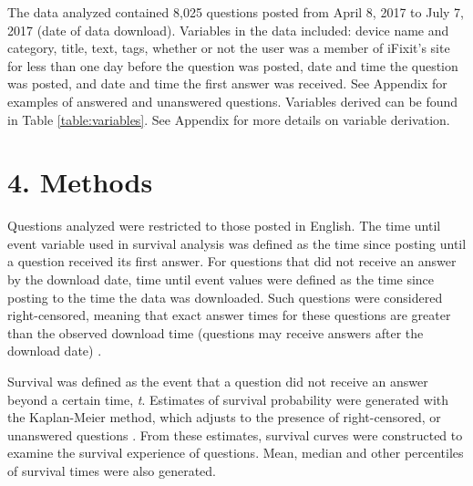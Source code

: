 \documentclass{article}
\begin{document}
The data analyzed contained 8,025 questions posted from April 8, 2017 to July 7, 2017 (date of data download). Variables in the data included: device name and category, title, text, tags, whether or not the user was a member of iFixit's site for less than one day before the question was posted, date and time the question was posted, and date and time the first answer was received. See Appendix for examples of answered and unanswered questions. Variables derived can be found in Table \ref{table:variables}. See Appendix for more details on variable derivation. 


\section*{4. Methods}

Questions analyzed were restricted to those posted in English. The time until event variable used in survival analysis was defined as the time since posting until a question received its first answer. For questions that did not receive an answer by the download date, time until event values were defined as the time since posting to the time the data was downloaded. Such questions were considered right-censored, meaning that exact answer times for these questions are greater than the observed download time (questions may receive answers after the download date) \cite{Kleinbaum2011}. 

Survival was defined as the event that a question did not receive an answer beyond a certain time, \textit{t}. Estimates of survival probability were generated with the Kaplan-Meier method, which adjusts to the presence of right-censored, or unanswered questions \cite{Bland1998}. From these estimates, survival curves were constructed to examine the survival experience of questions. Mean, median and other percentiles of survival times were also generated. 
\end{document}
